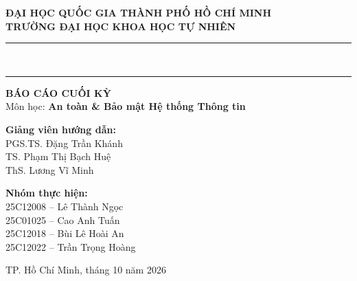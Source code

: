\documentclass[12pt,a4paper]{report}
\begin{document}
\begin{titlepage}
\begin{center}

{\large\bfseries ĐẠI HỌC QUỐC GIA THÀNH PHỐ HỒ CHÍ MINH}\\[4pt]
{\large\bfseries TRƯỜNG ĐẠI HỌC KHOA HỌC TỰ NHIÊN}\\[6pt]
\rule{\textwidth}{1.5pt}\\[6pt]
\rule{\textwidth}{0.5pt}

\vspace{1.5cm}
{\Large\bfseries BÁO CÁO CUỐI KỲ}\\[0.5cm]
{\large Môn học: \textbf{An toàn \& Bảo mật Hệ thống Thông tin}}

\vspace{1.2cm}

\vspace{1.2cm}
\begin{minipage}{0.48\textwidth}
\begin{flushleft}
{\large\bfseries Giảng viên hướng dẫn:}\\[4pt]
PGS.TS. Đặng Trần Khánh\\
TS. Phạm Thị Bạch Huệ\\
ThS. Lương Vĩ Minh
\end{flushleft}
\end{minipage}
\hfill
\begin{minipage}{0.48\textwidth}
\begin{flushright}
{\large\bfseries Nhóm thực hiện:}\\[4pt]
25C12008 -- Lê Thành Ngọc\\
25C01025 -- Cao Anh Tuấn\\
25C12018 -- Bùi Lê Hoài An\\
25C12022 -- Trần Trọng Hoàng
\end{flushright}
\end{minipage}

\vfill
{\large TP. Hồ Chí Minh, tháng 10 năm 2026}
\end{center}
\end{titlepage}
\end{document}

